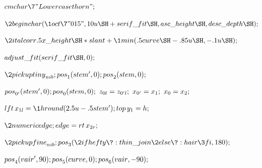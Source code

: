 
\BL
$\\{cmchar}\7"Lowercase thorn";$\par
$\2{beginchar}(\1{oct}\7"015",10u\SH +\\{serif\_fit}\SH ,\\{asc\_height}\SH ,%
\\{desc\_depth}\SH );$\par
$\2{italcorr}.5\\{x\_height}\SH \ast \\{slant}+\1{min}(.5\\{curve}\SH -.85u\SH
,-.1u\SH );$\par
$\\{adjust\_fit}(\\{serif\_fit}\SH ,0);$\par
$\2{pickup}\\{tiny}_{nib};\ \\{pos}_{1}(\\{stem}',0);\ \\{pos}_{2}(%
\\{stem},0);$\par
$\\{pos}_{0'}(\\{stem}',0);\ \\{pos}_{0}(\\{stem},0);\ z_{0l}=z_{0'l};\
x_{0'}=x_{1};\ x_{0}=x_{2};$\par
$\\{lft}\,x_{1l}=\1{hround}(2.5u-.5\\{stem}');\ \\{top}\,y_{1}=h;$\par
$\2{numeric}\\{edge};\ \\{edge}=\\{rt}\,x_{2r};$\par
$\2{pickup}\\{fine}_{nib};\ \\{pos}_{3}(\2{if}\\{hefty}\?:\\{thin\_join}%
\2{else}\?:\\{hair}\3{fi},180);$\par
$\\{pos}_{4}(\\{vair}',90);\ \\{pos}_{5}(\\{curve},0);\ \\{pos}_{6}(%
\\{vair},-90);$\par
